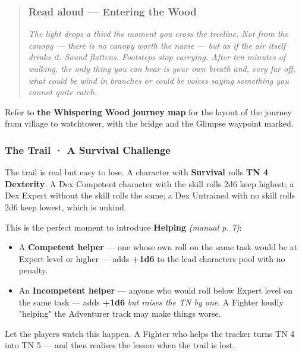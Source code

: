 \documentclass[10pt,a4paper]{article}
\newcommand{\tightlist}{\setlength{\itemsep}{0pt}\setlength{\parskip}{0pt}}
\begin{document}
\begin{quote}
\subsubsection{Read aloud --- Entering the Wood}\label{read-aloud--entering-the-wood}

\emph{The light drops a third the moment you cross the treeline. Not from the canopy --- there is no canopy worth the name --- but as if the air itself drinks it. Sound flattens. Footsteps stop carrying. After ten minutes of walking, the only thing you can hear is your own breath and, very far off, what could be wind in branches or could be voices saying something you cannot quite catch.}
\end{quote}

Refer to \textbf{the Whispering Wood journey map} for the layout of the journey from village to watchtower, with the bridge and the Glimpse waypoint marked.

\subsubsection{The Trail · A Survival Challenge}\label{the-trail--a-survival-challenge}

The trail is real but easy to lose. A character with \textbf{Survival} rolls \textbf{TN 4 Dexterity}. A Dex Competent character with the skill rolls 2d6 keep highest; a Dex Expert without the skill rolls the same; a Dex Untrained with no skill rolls 2d6 keep lowest, which is unkind.

This is the perfect moment to introduce \textbf{Helping} \emph{(manual p. 7)}:

\begin{itemize}
\tightlist
\item
  A \textbf{Competent helper} --- one whose own roll on the same task would be at Expert level or higher --- adds \textbf{+1d6} to the lead character\textquotesingle s pool with no penalty.
\item
  An \textbf{Incompetent helper} --- anyone who would roll below Expert level on the same task --- adds \textbf{+1d6} \emph{but raises the TN by one}. A Fighter loudly "helping" the Adventurer track may make things worse.
\end{itemize}

Let the players watch this happen. A Fighter who helps the tracker turns TN 4 into TN 5 --- and then realises the lesson when the trail is lost.
\end{document}
